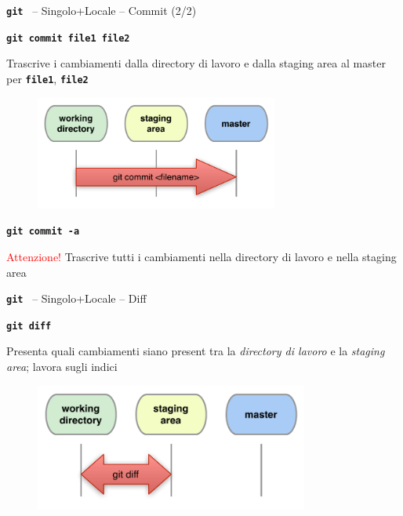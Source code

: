 \documentclass{beamer}
\newcommand{\git}{\texttt{\textbf{git}}\xspace}
\begin{document}
\begin{frame}{\centerline{ \git ~ -- Singolo+Locale -- Commit (2/2)}}
  \begin{center}
    \texttt{\textbf{git commit file1 file2}}
  \end{center}
  Trascrive i cambiamenti dalla directory di lavoro e dalla staging area al master per \texttt{\textbf{file1}},
  \texttt{\textbf{file2}} 
  \begin{figure}
    \centering
    \includegraphics[width=8cm]{A2023.LavoroCondiviso/local-commit-filename}
  \end{figure}
  \begin{center}
    \texttt{\textbf{git commit -a}}
  \end{center}
  \textcolor{red}{Attenzione! } Trascrive tutti i cambiamenti nella directory di lavoro e nella staging area
\end{frame}

\begin{frame}{\centerline{ \git ~ -- Singolo+Locale -- Diff }}
  \begin{center}
    \texttt{\textbf{git diff}}
  \end{center}
  Presenta quali cambiamenti siano present tra la \emph{directory di lavoro} e la
  \emph{staging area}; lavora sugli indici
  \begin{figure}
    \centering
    \includegraphics[width=9cm]{A2023.LavoroCondiviso/local-diff}
  \end{figure}
\end{frame}
\end{document}
